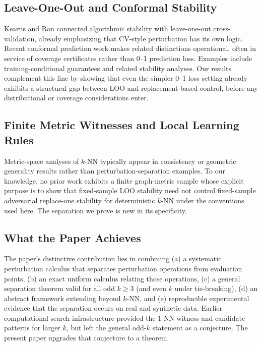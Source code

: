 \subsection{Leave-One-Out and Conformal Stability}

Kearns and Ron \cite{kearns1999algorithmic} connected algorithmic stability
with leave-one-out cross-validation, already emphasizing that CV-style
perturbation has its own logic.  Recent conformal prediction work makes related
distinctions operational, often in service of coverage certificates rather than
0--1 prediction loss.  Examples include training-conditional guarantees
\cite{liang2023algorithmic,pournaderi2024training} and related stability
analyses.  Our results complement this line by showing
that even the simpler 0--1 loss setting already exhibits a structural gap
between LOO and replacement-based control, before any distributional or
coverage considerations enter.

\subsection{Finite Metric Witnesses and Local Learning Rules}

Metric-space analyses of $k$-NN typically appear in consistency or geometric
generality results \cite{collins2020consistency} rather than
perturbation-separation examples.  To our knowledge, no prior work exhibits
a finite graph-metric sample whose explicit purpose is to show that
fixed-sample LOO stability need not control fixed-sample adversarial replace-one
stability for deterministic $k$-NN under the conventions used here.  The
separation we prove is new in its specificity.

\subsection{What the Paper Achieves}

The paper's distinctive contribution lies in combining (a) a systematic
perturbation calculus that separates perturbation operations from evaluation
points, (b) an exact uniform calculus relating those operations, (c) a general
separation theorem valid for all odd $k \ge 3$ (and even $k$ under
tie-breaking), (d) an abstract framework extending beyond $k$-NN, and
(e) reproducible experimental evidence that the separation occurs on real and
synthetic data.  Earlier computational search infrastructure
\cite{codex2025codex} provided the $1$-NN witness and candidate patterns for
larger $k$, but left the general odd-$k$ statement as a conjecture.  The present
paper upgrades that conjecture to a theorem.
